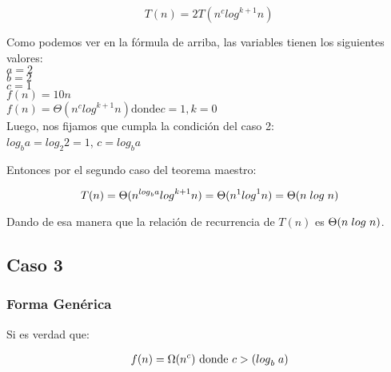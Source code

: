 \documentclass[12pt]{article} %
\begin{document}
\begin{equation*}
    \label{eq:ecuacion6}
    \ T(n)=2 T({n}^{c} {log}^{k+1} n)
\end{equation*}

\justify Como podemos ver en la fórmula de arriba, las variables tienen los siguientes valores:\\


     \justify $a = 2$ \\
     $b = 2 $\\
     $c = 1 $\\
     $f(n) = 10n$ \\
     $f(n) = \Theta ({n}^{c} {log}^{k+1} n) \text{donde} c = 1, k=0$ \\
    

Luego, nos fijamos que cumpla la condición del caso 2:\\
\vspace{0.5cm}
${log}_{b} a = {log}_{2} 2 = 1 $, 
 $c = {log}_{b} a$

Entonces por el segundo caso del teorema maestro:

\begin{equation*}
    \label{eq:ecuacion5}
    \ T(n)=\Theta ({n}^{{log}_{b} a} {log}^{k+1} n) = \Theta ({n}^{1} {log}^{1} n) =  \Theta (n\hspace{1mm} log \hspace{1mm}n)
\end{equation*}


Dando de esa manera que la relación de recurrencia de $T(n)$ es $\Theta (n\hspace{1mm}  log \hspace{1mm} n)$.

\subsection{Caso 3}
\subsubsection{Forma Genérica}
Si es verdad que:

\begin{gather*}
    \label{eq:ecuacion6}
    \ f(n)=\Omega ({n}^{c}) \text{ donde } c > ( {log}_{b}\hspace{1mm} a)
\end{gather*}
\end{document}
